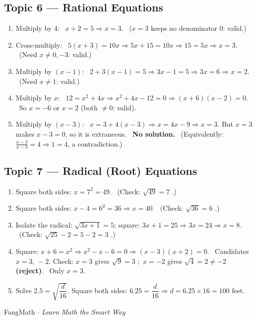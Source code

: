\documentclass[11pt]{article}
\begin{document}
\subsection*{\color{FangBlue}Topic 6 --- Rational Equations}
\begin{enumerate}[leftmargin=2em,itemsep=6pt]
  \item Multiply by $4$: \ $x + 2 = 5 \Rightarrow \boxed{x = 3}.$ \ ($x=3$ keeps no denominator $0$: valid.)
  \item Cross-multiply: \ $5(x+3) = 10x \Rightarrow 5x + 15 = 10x \Rightarrow 15 = 5x \Rightarrow \boxed{x = 3}.$
        \ (Need $x\neq 0,-3$: valid.)
  \item Multiply by $(x-1)$: \ $2 + 3(x-1) = 5 \Rightarrow 3x - 1 = 5 \Rightarrow 3x = 6 \Rightarrow \boxed{x = 2}.$
        \ (Need $x\neq 1$: valid.)
  \item Multiply by $x$: \ $12 = x^2 + 4x \Rightarrow x^2 + 4x - 12 = 0 \Rightarrow (x+6)(x-2) = 0.$
        \ So $\boxed{x = -6 \text{ or } x = 2}$ (both $\neq 0$: valid).
  \item Multiply by $(x-3)$: \ $x = 3 + 4(x-3) \Rightarrow x = 4x - 9 \Rightarrow x = 3.$
        But $x = 3$ makes $x-3 = 0$, so it is extraneous. \ \textbf{No solution.}
        \ (Equivalently: $\frac{x-3}{x-3} = 4 \Rightarrow 1 = 4$, a contradiction.)
\end{enumerate}

\subsection*{\color{FangBlue}Topic 7 --- Radical (Root) Equations}
\begin{enumerate}[leftmargin=2em,itemsep=6pt]
  \item Square both sides: $x = 7^{2} = \boxed{49}.$ \ (Check: $\sqrt{49}=7$ \checkmark.)
  \item Square both sides: $x - 4 = 6^{2} = 36 \Rightarrow \boxed{x = 40}.$ \ (Check: $\sqrt{36}=6$ \checkmark.)
  \item Isolate the radical: $\sqrt{3x+1} = 5$; square: $3x + 1 = 25 \Rightarrow 3x = 24 \Rightarrow \boxed{x = 8}.$
        \ (Check: $\sqrt{25}-2 = 5-2 = 3$ \checkmark.)
  \item Square: $x + 6 = x^{2} \Rightarrow x^{2} - x - 6 = 0 \Rightarrow (x-3)(x+2) = 0.$
        \ Candidates $x = 3,\,-2$. Check: $x=3$ gives $\sqrt{9}=3$ \checkmark;\
        $x=-2$ gives $\sqrt{4}=2 \neq -2$ \textbf{\color{FangAccent}(reject)}. \ Only $\boxed{x = 3}.$
  \item Solve $2.5 = \sqrt{\dfrac{d}{16}}$. Square both sides: $6.25 = \dfrac{d}{16}
        \Rightarrow d = 6.25 \times 16 = \boxed{100 \text{ feet}}.$
\end{enumerate}

\vfill
\begin{center}
{\small\color{RuleGray}FangMath $\cdot$ \emph{Learn Math the Smart Way}}
\end{center}
\end{document}
